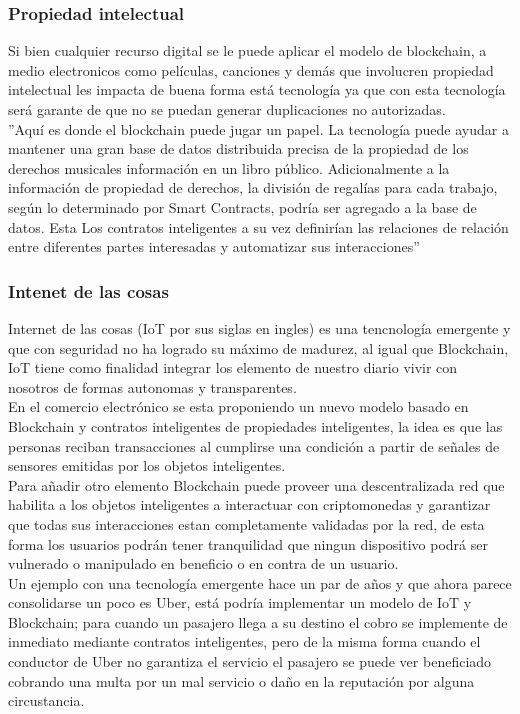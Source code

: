 \subsubsection{Propiedad intelectual}
Si bien cualquier recurso digital se le puede aplicar el modelo de blockchain, a medio electronicos como películas, canciones y demás que involucren propiedad intelectual les impacta de buena forma está tecnología ya que con esta tecnología será garante de que no se puedan generar duplicaciones no autorizadas. \citep{huckle2016internet}
\\
''Aquí es donde el blockchain puede jugar un papel. La tecnología puede ayudar a mantener una gran base de datos distribuida precisa de la propiedad de los derechos musicales información en un libro público. Adicionalmente a la información de propiedad de derechos, la división de regalías para cada trabajo, según lo determinado por Smart Contracts, podría ser agregado a la base de datos. Esta Los contratos inteligentes a su vez definirían las relaciones de relación entre diferentes partes interesadas  y automatizar sus interacciones'' \citep{crosby2016blockchain}

\subsubsection{Intenet de las cosas}
Internet de las cosas (IoT por sus siglas en ingles) es una tencnología emergente y que con seguridad no ha logrado su máximo de madurez, al igual que Blockchain, IoT tiene como finalidad integrar los elemento de nuestro diario vivir con nosotros de formas autonomas y transparentes.
\\
En el comercio electrónico se esta proponiendo un nuevo modelo basado en Blockchain y contratos inteligentes de propiedades inteligentes, la idea es que las personas reciban transacciones al cumplirse una condición  a partir de señales de sensores emitidas por los  objetos inteligentes. \citep{zheng2016blockchain}
\\
Para añadir otro elemento Blockchain puede proveer una descentralizada red que habilita a los  objetos inteligentes a interactuar con criptomonedas y garantizar que todas sus interacciones estan completamente validadas por la red\citep{crosby2016blockchain}, de esta forma los usuarios podrán tener tranquilidad que ningun dispositivo podrá ser vulnerado o manipulado en beneficio o en contra de un usuario.
\\
Un ejemplo con una tecnología emergente hace un par de años y que ahora parece consolidarse un poco es Uber, está podría implementar un modelo de IoT y Blockchain; para cuando un pasajero llega a su destino el cobro se implemente de inmediato mediante contratos inteligentes, pero de la misma forma cuando el conductor de Uber no garantiza el servicio el pasajero se puede ver beneficiado cobrando una multa por un mal servicio o daño en la reputación por alguna circustancia.\citep{huckle2016internet}


